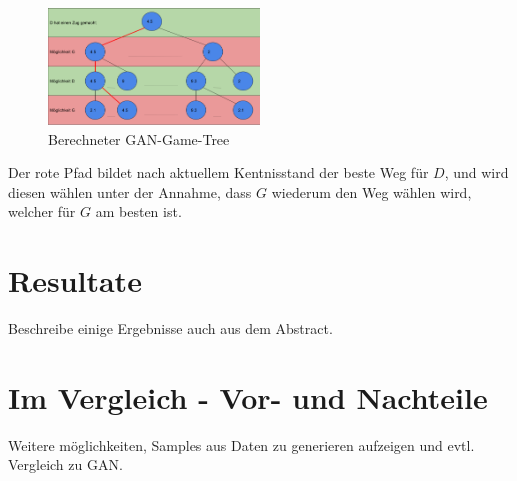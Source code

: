 \begin{figure}[h!]
    \begin{center}
        \includegraphics[width=0.5\textwidth]{../common/02_main/resources/04_gan_game_tree_filled.png}
    \end{center}
    \caption{Berechneter GAN-Game-Tree}
    \label{fig:Berechneter GAN-Game-Tree}
\end{figure}
Der rote Pfad bildet nach aktuellem Kentnisstand der beste Weg für $D$, und wird diesen wählen unter der Annahme,
dass $G$ wiederum den Weg wählen wird, welcher für $G$ am besten ist.
\section{Resultate}
Beschreibe einige Ergebnisse auch aus dem Abstract.
\section{Im Vergleich - Vor- und Nachteile}
Weitere möglichkeiten, Samples aus Daten zu generieren aufzeigen und evtl. Vergleich zu GAN.